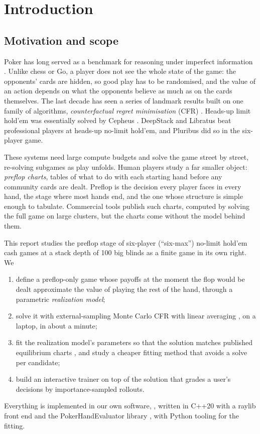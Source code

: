 \chapter{Introduction}\label{ch:intro}

\section{Motivation and scope}\label{sec:intro-scope}

Poker has long served as a benchmark for reasoning under imperfect information \cite{billings2002}. Unlike chess or Go, a player does not see the whole state of the game: the opponents' cards are hidden, so good play has to be randomised, and the value of an action depends on what the opponents believe as much as on the cards themselves. The last decade has seen a series of landmark results built on one family of algorithms, \emph{counterfactual regret minimisation} (CFR) \cite{zinkevich2007}. Heads-up limit hold'em was essentially solved by Cepheus \cite{bowling2015}. DeepStack \cite{moravcik2017} and Libratus \cite{brown2018} beat professional players at heads-up no-limit hold'em, and Pluribus \cite{brown2019pluribus} did so in the six-player game.

These systems need large compute budgets and solve the game street by street, re-solving subgames as play unfolds. Human players study a far smaller object: \emph{preflop charts}, tables of what to do with each starting hand before any community cards are dealt. Preflop is the decision every player faces in every hand, the stage where most hands end, and the one whose structure is simple enough to tabulate. Commercial tools publish such charts, computed by solving the full game on large clusters, but the charts come without the model behind them.

This report studies the preflop stage of six-player (\enquote{six-max}) no-limit hold'em cash games at a stack depth of 100 big blinds as a finite game in its own right. We
\begin{enumerate}[label=(\roman*)]
  \item define a preflop-only game whose payoffs at the moment the flop would be dealt approximate the value of playing the rest of the hand, through a parametric \emph{realization model};
  \item solve it with external-sampling Monte Carlo CFR \cite{lanctot2009} with linear averaging \cite{brown2019discounted}, on a laptop, in about a minute;
  \item fit the realization model's parameters so that the solution matches published equilibrium charts \cite{pokertrainer}, and study a cheaper fitting method that avoids a solve per candidate;
  \item build an interactive trainer on top of the solution that grades a user's decisions by importance-sampled rollouts.
\end{enumerate}
Everything is implemented in our own software, \pf{}, written in C++20 with a raylib front end \cite{raylib} and the PokerHandEvaluator library \cite{phevaluator}, with Python tooling for the fitting.

